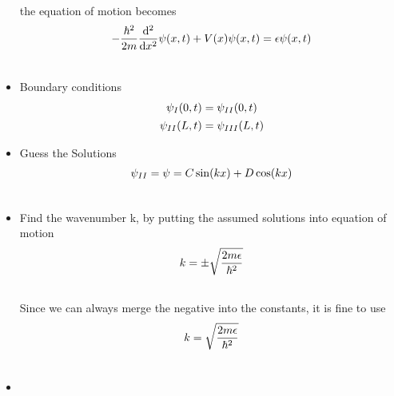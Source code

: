 \documentclass[letterpaper,10pt,english]{sphinxmanual}
\def\d{{\rm d}}
\begin{document}
\begin{itemize}
\begin{gather}
\end{gather}
the equation of motion becomes
\begin{gather}
\begin{split}- \frac{\hbar ^2}{2 m} \frac{\d^2}{\d x^2} \psi(x,t) + V(x) \psi(x,t) = \epsilon \psi(x,t)\end{split}\notag\\\begin{split}\end{split}\notag
\end{gather}
\item {} 
Boundary conditions
\begin{gather}
\begin{split}\psi _ I(0,t) = \psi _ {II}(0,t)\end{split}\notag\\\begin{split}\psi _ {II}(L, t) = \psi _ {III}(L, t)\end{split}\notag
\end{gather}
\item {} 
Guess the Solutions
\begin{gather}
\begin{split}\psi_{II} = \psi = C \sin (k x) + D \cos(kx)\end{split}\notag\\\begin{split}\end{split}\notag
\end{gather}
\item {} 
Find the wavenumber k, by putting the assumed solutions into equation of motion
\begin{gather}
\begin{split}k = \pm \sqrt{\frac{2m \epsilon}{\hbar^2} }\end{split}\notag\\\begin{split}\end{split}\notag
\end{gather}
Since we can always merge the negative into the constants, it is fine to use
\begin{gather}
\begin{split}k = \sqrt{\frac{2m \epsilon}{\hbar^2} }\end{split}\notag\\\begin{split}\end{split}\notag
\end{gather}
\item {} \begin{description}

\end{description}
\end{itemize}
\end{document}
